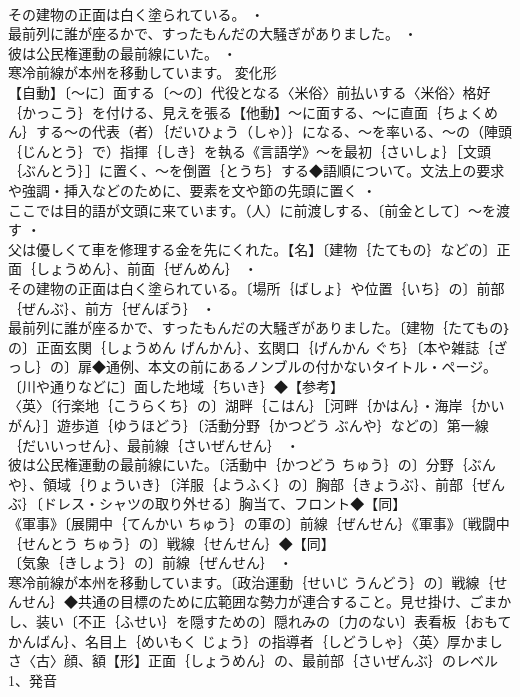 \documentclass[8pt]{extreport}
\begin{document}
\begin{CJK}{UTF8}{min}
\\	その建物の正面は白く塗られている。 ・
\\	最前列に誰が座るかで、すったもんだの大騒ぎがありました。 ・
\\	彼は公民権運動の最前線にいた。 ・
\\	寒冷前線が本州を移動しています。	変化形 
\\	【自動】〔～に〕面する〔～の〕代役となる〈米俗〉前払いする〈米俗〉格好｛かっこう｝を付ける、見えを張る【他動】～に面する、～に直面｛ちょくめん｝する～の代表（者）｛だいひょう（しゃ）｝になる、～を率いる、～の（陣頭｛じんとう｝で）指揮｛しき｝を執る《言語学》～を最初｛さいしょ｝［文頭｛ぶんとう｝］に置く、～を倒置｛とうち｝する◆語順について。文法上の要求や強調・挿入などのために、要素を文や節の先頭に置く ・
\\	ここでは目的語が文頭に来ています。（人）に前渡しする、〔前金として〕～を渡す ・
\\	父は優しくて車を修理する金を先にくれた。【名】〔建物｛たてもの｝などの〕正面｛しょうめん｝、前面｛ぜんめん｝ ・
\\	その建物の正面は白く塗られている。〔場所｛ばしょ｝や位置｛いち｝の〕前部｛ぜんぶ｝、前方｛ぜんぽう｝ ・
\\	最前列に誰が座るかで、すったもんだの大騒ぎがありました。〔建物｛たてもの｝の〕正面玄関｛しょうめん げんかん｝、玄関口｛げんかん ぐち｝〔本や雑誌｛ざっし｝の〕扉◆通例、本文の前にあるノンブルの付かないタイトル・ページ。〔川や通りなどに〕面した地域｛ちいき｝◆【参考】
\\	〈英〉〔行楽地｛こうらくち｝の〕湖畔｛こはん｝［河畔｛かはん｝・海岸｛かいがん｝］遊歩道｛ゆうほどう｝〔活動分野｛かつどう ぶんや｝などの〕第一線｛だいいっせん｝、最前線｛さいぜんせん｝ ・
\\	彼は公民権運動の最前線にいた。〔活動中｛かつどう ちゅう｝の〕分野｛ぶんや｝、領域｛りょういき｝〔洋服｛ようふく｝の〕胸部｛きょうぶ｝、前部｛ぜんぶ｝〔ドレス・シャツの取り外せる〕胸当て、フロント◆【同】
\\	《軍事》〔展開中｛てんかい ちゅう｝の軍の〕前線｛ぜんせん｝《軍事》〔戦闘中｛せんとう ちゅう｝の〕戦線｛せんせん｝◆【同】
\\	〔気象｛きしょう｝の〕前線｛ぜんせん｝ ・
\\	寒冷前線が本州を移動しています。〔政治運動｛せいじ うんどう｝の〕戦線｛せんせん｝◆共通の目標のために広範囲な勢力が連合すること。見せ掛け、ごまかし、装い〔不正｛ふせい｝を隠すための〕隠れみの〔力のない〕表看板｛おもてかんばん｝、名目上｛めいもく じょう｝の指導者｛しどうしゃ｝〈英〉厚かましさ〈古〉顔、額【形】正面｛しょうめん｝の、最前部｛さいぜんぶ｝のレベル1、発音

\end{CJK}
\end{document}
